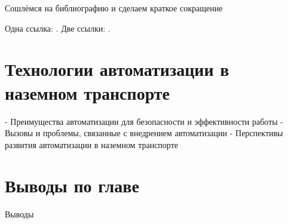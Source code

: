 Сошлёмся на библиографию и сделаем краткое сокращение 

Одна ссылка: \cite[с.~39]{Evtukov}.
Две ссылки: \cite{doi:10.36652/1684-1298-2023-36-39,Baumana}.

\section{Технологии автоматизации в наземном транспорте}\label{sec:ch1/sec3}

- Преимущества автоматизации для безопасности и эффективности работы
- Вызовы и проблемы, связанные с внедрением автоматизации
- Перспективы развития автоматизации в наземном транспорте

\section{Выводы по главе}\label{sec:ch1/sec4}

Выводы

\FloatBarrier
